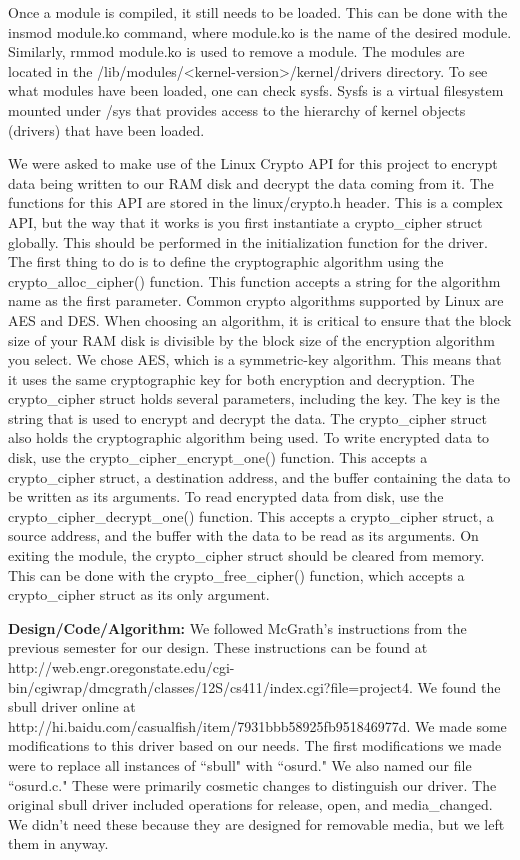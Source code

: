 \documentclass[letterpaper,10pt,titlepage]{article}
\newcommand{\tab}{\hspace*{2em}} %
\begin{document}
\begin{enumerate}
\tab Once a module is compiled, it still needs to be loaded. This can be done with the insmod module.ko command, where module.ko is the name of the desired module. Similarly, rmmod module.ko is used to remove a module. The modules are located in the /lib/modules/<kernel-version>/kernel/drivers directory. To see what modules have been loaded, one can check sysfs. Sysfs is a virtual filesystem mounted under /sys that provides access to the hierarchy of kernel objects (drivers) that have been loaded.

\tab We were asked to make use of the Linux Crypto API for this project to encrypt data being written to our RAM disk and decrypt the data coming from it. The functions for this API are stored in the linux/crypto.h header. This is a complex API, but the way that it works is you first instantiate a crypto_cipher struct globally. This should be performed in the initialization function for the driver. The first thing to do is to define the cryptographic algorithm using the crypto\_alloc\_cipher() function. This function accepts a string for the algorithm name as the first parameter. Common crypto algorithms supported by Linux are AES and DES. When choosing an algorithm, it is critical to ensure that the block size of your RAM disk is divisible by the block size of the encryption algorithm you select. We chose AES, which is a symmetric-key algorithm. This means that it uses the same cryptographic key for both encryption and decryption. The crypto\_cipher struct holds several parameters, including the key. The key is the string that is used to encrypt and decrypt the data. The crypto\_cipher struct also holds the cryptographic algorithm being used. To write encrypted data to disk, use the crypto\_cipher\_encrypt\_one() function. This accepts a crypto_cipher struct, a destination address, and the buffer containing the data to be written as its arguments. To read encrypted data from disk, use the crypto\_cipher\_decrypt\_one() function. This accepts a crypto_cipher struct, a source address, and the buffer with the data to be read as its arguments. On exiting the module, the crypto_cipher struct should be cleared from memory. This can be done with the crypto\_free\_cipher() function, which accepts a crypto\_cipher struct as its only argument. 

\tab \textbf{Design/Code/Algorithm:} 
\tab We followed McGrath's instructions from the previous semester for our design. These instructions can be found at http://web.engr.oregonstate.edu/cgi-bin/cgiwrap/dmcgrath/classes/12S/cs411/index.cgi?file=project4. We found the sbull driver online at http://hi.baidu.com/casualfish/item/7931bbb58925fb951846977d. We made some modifications to this driver based on our needs. The first modifications we made were to replace all instances of ``sbull" with ``osurd." We also named our file ``osurd.c." These were primarily cosmetic changes to distinguish our driver. The original sbull driver included operations for release, open, and media_changed. We didn't need these because they are designed for removable media, but we left them in anyway. 


\end{enumerate}
\end{document}
